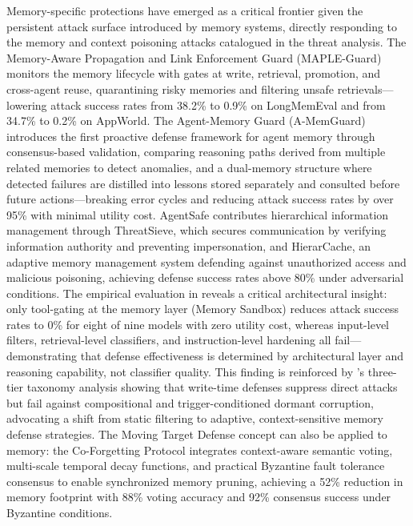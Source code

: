 \documentclass[11pt]{article}
\begin{document}
Memory-specific protections have emerged as a critical frontier given the persistent attack surface introduced by memory systems, directly responding to the memory and context poisoning attacks catalogued in the threat analysis. The Memory-Aware Propagation and Link Enforcement Guard (MAPLE-Guard) \cite{ref430} monitors the memory lifecycle with gates at write, retrieval, promotion, and cross-agent reuse, quarantining risky memories and filtering unsafe retrievals---lowering attack success rates from 38.2\% to 0.9\% on LongMemEval and from 34.7\% to 0.2\% on AppWorld. The Agent-Memory Guard (A-MemGuard) \cite{ref431} introduces the first proactive defense framework for agent memory through consensus-based validation, comparing reasoning paths derived from multiple related memories to detect anomalies, and a dual-memory structure where detected failures are distilled into lessons stored separately and consulted before future actions---breaking error cycles and reducing attack success rates by over 95\% with minimal utility cost. AgentSafe \cite{ref432} contributes hierarchical information management through ThreatSieve, which secures communication by verifying information authority and preventing impersonation, and HierarCache, an adaptive memory management system defending against unauthorized access and malicious poisoning, achieving defense success rates above 80\% under adversarial conditions. The empirical evaluation in \cite{ref433} reveals a critical architectural insight: only tool-gating at the memory layer (Memory Sandbox) reduces attack success rates to 0\% for eight of nine models with zero utility cost, whereas input-level filters, retrieval-level classifiers, and instruction-level hardening all fail---demonstrating that defense effectiveness is determined by architectural layer and reasoning capability, not classifier quality. This finding is reinforced by \cite{ref434}'s three-tier taxonomy analysis showing that write-time defenses suppress direct attacks but fail against compositional and trigger-conditioned dormant corruption, advocating a shift from static filtering to adaptive, context-sensitive memory defense strategies. The Moving Target Defense concept can also be applied to memory: the Co-Forgetting Protocol \cite{ref435} integrates context-aware semantic voting, multi-scale temporal decay functions, and practical Byzantine fault tolerance consensus to enable synchronized memory pruning, achieving a 52\% reduction in memory footprint with 88\% voting accuracy and 92\% consensus success under Byzantine conditions.
\end{document}
